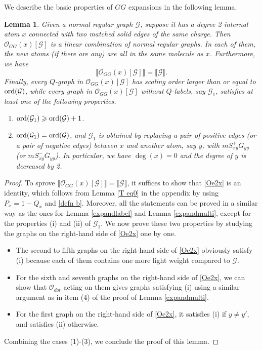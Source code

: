 \documentclass{article}
\newcommand{\1}{\mathds{1}}
\numberwithin{equation}{section}
\newcommand{\ord}{{\rm{ord}}}
\renewcommand{\cal}{\mathcal}
\renewcommand{\geq}{\geqslant}
\renewcommand{\ge}{\geq}
\theoremstyle{plain} %
\newtheorem{lemma}[theorem]{Lemma}
\theoremstyle{remark}
\begin{document}
\iffalse
 We describe the basic properties of $GG$ expansions in the following lemma.
  \begin{lemma}\label{expandG2}
 Given a normal regular graph $\cal G$, suppose it has a degree 2 internal atom $x$ connected with two matched solid edges of the same charge. Then ${\cal O}_{GG}(x)[\cal G]$ is a linear combination of normal regular graphs. In each of them, the new atoms (if there are any) are all in the same molecule as $x$. Furthermore, we have 
 $$ \llbracket {\cal O}_{GG}(x)[\cal G]\rrbracket  =\llbracket \cal G\rrbracket.$$  Finally, every $Q$-graph in ${\cal O}_{GG}(x)[\cal G]$ has scaling order larger than or equal to $\ord(\cal G)$, while every graph in ${\cal O}_{GG}(x)[\cal G]$ without $Q$-labels, say $\cal G_1$, satisfies at least one of the following properties. 
\begin{enumerate}
\item $\ord(\cal G_1)\ge \ord(\cal G) +1$.
\item $\ord(\cal G_1)= \ord(\cal G)$, and $\cal G_1$ is obtained by replacing a pair of positive edges (or a pair of negative edges) between $x$ and another atom, say $y$, with $m S^{+}_{xy} G_{y y}$ (or $m S^{-}_{xy} \overline G_{y y}$). In particular, we have $\deg(x)=0$ and the degree of $y$ is decreased by 2.
\end{enumerate}
 \end{lemma}
   \begin{proof} 
To sprove  $ \llbracket {\cal O}_{GG}(x)[\cal G]\rrbracket  =\llbracket \cal G\rrbracket$, it suffices to show that \eqref{Oe2x} is an identity, which follows from Lemma \ref{T eq0} in the appendix by using
 $P_x = 1-Q_x$ and \eqref{defn b}. Moreover, all the statements can be proved in a similar way as the ones for Lemma \ref{expandlabel} and Lemma \ref{expandmulti}, except for the properties (i) and (ii) of $\cal G_1$. We now prove these two properties by studying the graphs on the right-hand side of \eqref{Oe2x} one by one. 
 
 \begin{itemize}
 \item[(1)] The second to fifth graphs on the right-hand side of \eqref{Oe2x} obviously satisfy (i) because each of them contains one more light weight compared to $\cal G$. 
 
\item[(2)] For the sixth and seventh graphs on the right-hand side of \eqref{Oe2x}, we can show that $\cal O_{dot}$ acting on them gives graphs satisfying (i) using a similar argument as in item (4) of the proof of  Lemma \ref{expandmulti}.

\item[(3)] For the first graph on the right-hand side of \eqref{Oe2x}, it satisfies (i) if $y\ne y'$, and satisfies (ii) otherwise. 
\end{itemize}
Combining the cases (1)-(3), we conclude the proof of this lemma.
     \end{proof} 
\end{document}

